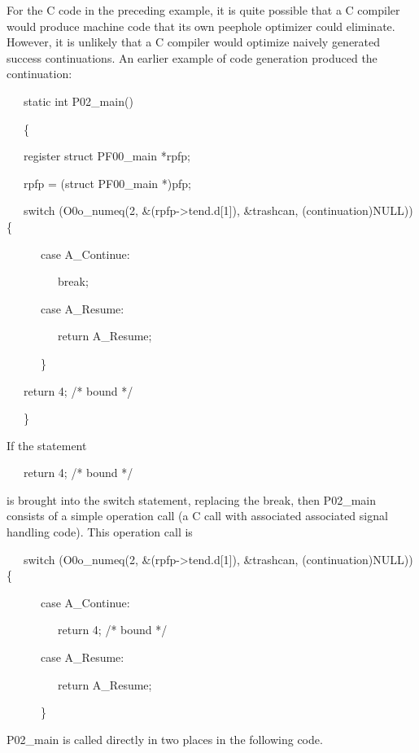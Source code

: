 For the C code in the preceding example, it is quite possible that a C
compiler would produce machine code that its own peephole optimizer
could eliminate. However, it is unlikely that a C compiler would
optimize naively generated success continuations. An earlier example
of code generation produced the continuation:

{\ttfamily\mdseries
\ \ \ static int P02\_main()}

{\ttfamily\mdseries
\ \ \ \{}

{\ttfamily\mdseries
\ \ \ register struct PF00\_main *rpfp;}


\bigskip

{\ttfamily\mdseries
\ \ \ rpfp = (struct PF00\_main *)pfp;}

{\ttfamily\mdseries
\ \ \ switch (O0o\_numeq(2, \&(rpfp-{\textgreater}tend.d[1]), \&trashcan, (continuation)NULL)) \{}

{\ttfamily\mdseries
\ \ \ \ \ \ case A\_Continue:}

{\ttfamily\mdseries
\ \ \ \ \ \ \ \ \ break;}

{\ttfamily\mdseries
\ \ \ \ \ \ case A\_Resume:}

{\ttfamily\mdseries
\ \ \ \ \ \ \ \ \ return A\_Resume;}

{\ttfamily\mdseries
\ \ \ \ \ \ \}}

{\ttfamily\mdseries
\ \ \ return 4; /* bound */}

{\ttfamily\mdseries
\ \ \ \}}


If the statement 

{\ttfamily\mdseries
\ \ \ return 4; /* bound */}

\noindent is brought into the switch statement, replacing the break,
then P02\_main consists of a simple operation call (a C call with
associated associated signal handling code). This operation call is

{\ttfamily\mdseries
\ \ \ switch (O0o\_numeq(2, \&(rpfp-{\textgreater}tend.d[1]), \&trashcan, (continuation)NULL)) \{}

{\ttfamily\mdseries
\ \ \ \ \ \ case A\_Continue:}

{\ttfamily\mdseries
\ \ \ \ \ \ \ \ \ return 4; /* bound */}

{\ttfamily\mdseries
\ \ \ \ \ \ case A\_Resume:}

{\ttfamily\mdseries
\ \ \ \ \ \ \ \ \ return A\_Resume;}

{\ttfamily\mdseries
\ \ \ \ \ \ \}}


P02\_main is called directly in two places in the following code. 

